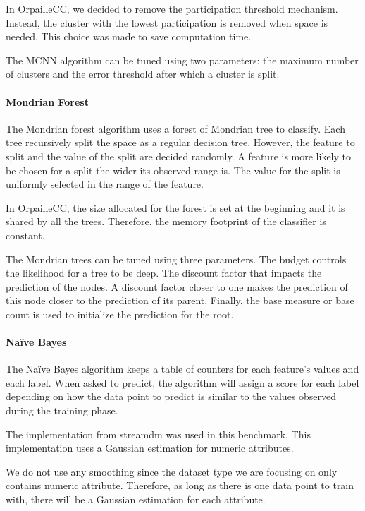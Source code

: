 In OrpailleCC, we decided to remove the
participation threshold mechanism.  Instead, the
cluster with the lowest participation is removed
when space is needed. This choice was made to save
computation time.

The MCNN algorithm can be tuned using two
parameters: the maximum number of clusters and the
error threshold after which a cluster is split.


\paragraph{Mondrian Forest~\cite{mondrian2014}}
The Mondrian forest algorithm uses a forest of
Mondrian tree to classify. Each tree recursively
split the space as a regular decision tree.
However, the feature to split and the value of the
split are decided randomly. A feature is more
likely to be chosen for a split the wider its
observed range is. The value for the split is
uniformly selected in the range of the feature.

In OrpailleCC, the size allocated for the forest
is set at the beginning and it is shared by all
the trees.  Therefore, the memory footprint of the
classifier is constant.

The Mondrian trees can be tuned using three
parameters. The budget controls the
likelihood for a tree to be deep.  The discount
factor that impacts the prediction of the nodes. A
discount factor closer to one makes the prediction
of this node closer to the prediction of its
parent. Finally, the base measure or base count is
used to initialize the prediction for the root.

\paragraph{Naïve Bayes~\cite{naive_bayes}}
The Naïve Bayes algorithm keeps a table of
counters for each feature's values and each label.
When asked to predict, the algorithm will assign a
score for each label depending on how the data
point to predict is similar to the values observed
during the training phase.

The implementation from streamdm was used in this
benchmark. This implementation uses a Gaussian
estimation for numeric attributes.

We do not use any smoothing since the dataset type
we are focusing on only contains numeric
attribute. Therefore, as long as there is one data
point to train with, there will be a Gaussian
estimation for each attribute.

